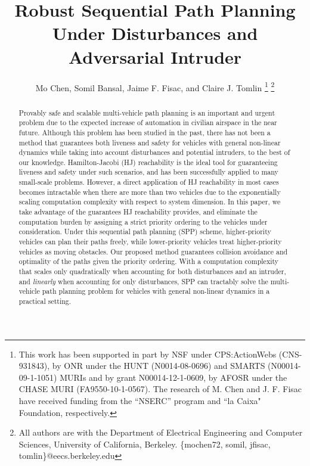 \documentclass[journal]{IEEEtran}
\title{\LARGE \bf Robust Sequential Path Planning Under Disturbances and Adversarial Intruder}
\author{Mo Chen, Somil Bansal, Jaime F. Fisac, and Claire J. Tomlin
\thanks{This work has been supported in part by NSF under CPS:ActionWebs (CNS-931843), by ONR under the HUNT (N0014-08-0696) and SMARTS (N00014-09-1-1051) MURIs and by grant N00014-12-1-0609, by AFOSR under the CHASE MURI (FA9550-10-1-0567). The research of M. Chen and J. F. Fisac have received funding from the ``NSERC'' program and ``la Caixa" Foundation, respectively.}
\thanks{All authors are with the Department of Electrical Engineering and Computer Sciences, University of California, Berkeley. \{mochen72, somil, jfisac, tomlin\}@eecs.berkeley.edu}
}
\begin{document}
\maketitle
\thispagestyle{empty}
\pagestyle{empty}

\begin{abstract}
Provably safe and scalable multi-vehicle path planning is an important and urgent problem due to the expected increase of automation in civilian airspace in the near future. Although this problem has been studied in the past, there has not been a method that guarantees both liveness and safety for vehicles with general non-linear dynamics while taking into account disturbances and potential intruders, to the best of our knowledge. Hamilton-Jacobi (HJ) reachability is the ideal tool for guaranteeing liveness and safety under such scenarios, and has been successfully applied to many small-scale problems. However, a direct application of HJ reachability in most cases becomes intractable when there are more than two vehicles due to the exponentially scaling computation complexity with respect to system dimension. In this paper, we take advantage of the guarantees HJ reachability provides, and eliminate the computation burden by assigning a strict priority ordering to the vehicles under consideration. Under this sequential path planning (SPP) scheme, higher-priority vehicles can plan their paths freely, while lower-priority vehicles treat higher-priority vehicles as moving obstacles. Our proposed method guarantees collision avoidance and optimality of the paths given the priority ordering. With a computation complexity that scales only quadratically when accounting for both disturbances and an intruder, and \textit{linearly} when accounting for only disturbances, SPP can tractably solve the multi-vehicle path planning problem for vehicles with general non-linear dynamics in a practical setting. 
\end{abstract}















\end{document}
